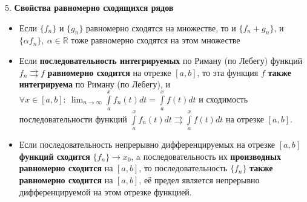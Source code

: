 5. \textbf{Свойства равномерно сходящихся рядов}
\begin{itemize}
    \item Если $\displaystyle \{f_n\}$ и $\displaystyle \{g_n\}$ равномерно сходятся на множестве, то и 
    $\displaystyle \{f_n + g_n\}$, и $\displaystyle \{\alpha f_n\},~\alpha \in \mathbb {R}$ 
    тоже равномерно сходятся на этом множестве
   
    \item Если \textbf{последовательность интегрируемых} по Риману (по Лебегу) функций 
    ${\displaystyle f_{n} \rightrightarrows f}$ \textbf{равномерно сходится} на отрезке ${\displaystyle [a,b]}$, 
    то эта функция $\displaystyle f$ \textbf{также интегрируема} по Риману (по Лебегу), и \\
    ${\displaystyle \forall x\in [a,b] :~\lim _{n\to \infty }\int \limits _{a}^{x}f_{n}(t)dt=\int \limits _{a}^{x}f(t)dt}$ 
    и сходимость последовательности функций
    ${\displaystyle \int \limits _{a}^{x}f_{n}(t)dt \rightrightarrows \int \limits _{a}^{x}f(t)dt}$
    на отрезке ${\displaystyle [a,b]}$.

    \item Если последовательность непрерывно дифференцируемых на отрезке ${\displaystyle [a,b]}$ 
    \textbf{функций сходится} ${\displaystyle \{f_{n}\} \rightarrow x_{0}}$, 
    a последовательность их \textbf{производных равномерно сходится} на ${\displaystyle [a,b]}$,
    то последовательность ${\displaystyle \{f_{n}\}}$ \textbf{также равномерно сходится} 
    на ${\displaystyle [a,b]}$, её предел является непрерывно дифференцируемой на этом отрезке функцией.
\end{itemize}
